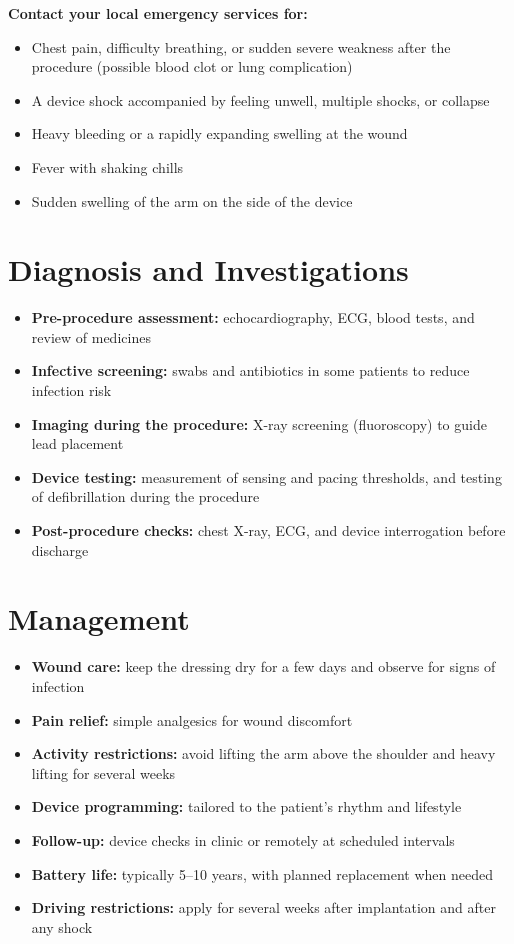 \textbf{Contact your local emergency services for:}
\begin{itemize}
    \item Chest pain, difficulty breathing, or sudden severe weakness after the procedure (possible blood clot or lung complication)
    \item A device shock accompanied by feeling unwell, multiple shocks, or collapse
    \item Heavy bleeding or a rapidly expanding swelling at the wound
    \item Fever with shaking chills
    \item Sudden swelling of the arm on the side of the device
\end{itemize}

\section*{Diagnosis and Investigations}
\begin{itemize}
    \item \textbf{Pre-procedure assessment:} echocardiography, ECG, blood tests, and review of medicines
    \item \textbf{Infective screening:} swabs and antibiotics in some patients to reduce infection risk
    \item \textbf{Imaging during the procedure:} X-ray screening (fluoroscopy) to guide lead placement
    \item \textbf{Device testing:} measurement of sensing and pacing thresholds, and testing of defibrillation during the procedure
    \item \textbf{Post-procedure checks:} chest X-ray, ECG, and device interrogation before discharge
\end{itemize}

\section*{Management}
\begin{itemize}
    \item \textbf{Wound care:} keep the dressing dry for a few days and observe for signs of infection
    \item \textbf{Pain relief:} simple analgesics for wound discomfort
    \item \textbf{Activity restrictions:} avoid lifting the arm above the shoulder and heavy lifting for several weeks
    \item \textbf{Device programming:} tailored to the patient's rhythm and lifestyle
    \item \textbf{Follow-up:} device checks in clinic or remotely at scheduled intervals
    \item \textbf{Battery life:} typically 5--10 years, with planned replacement when needed
    \item \textbf{Driving restrictions:} apply for several weeks after implantation and after any shock
\end{itemize}

